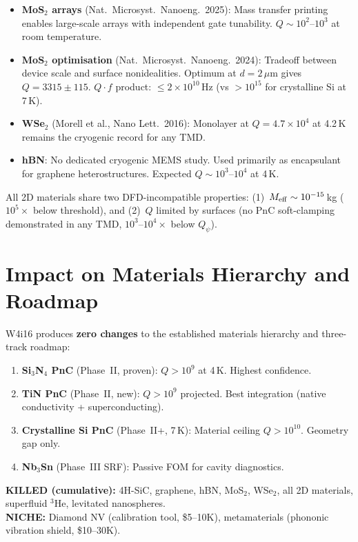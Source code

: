 \documentclass[11pt]{article}
\theoremstyle{definition}
\theoremstyle{remark}
\newcommand{\ee}[1]{\times 10^{#1}}
\newcommand{\Meff}{M_{\rm eff}}
\newcommand{\Qpsi}{Q_\psi}
\begin{document}
\begin{itemize}[nosep]
\item \textbf{MoS$_2$ arrays} (Nat.\ Microsyst.\ Nanoeng.\ 2025):
  Mass transfer printing enables large-scale arrays with independent
  gate tunability. $Q \sim 10^2$--$10^3$ at room temperature.
\item \textbf{MoS$_2$ optimisation} (Nat.\ Microsyst.\ Nanoeng.\ 2024):
  Tradeoff between device scale and surface nonidealities. Optimum at
  $d = 2$\,$\mu$m gives $Q = 3315 \pm 115$.
  $Q \cdot f$ product: $\leq 2\ee{10}$\,Hz (vs $> 10^{15}$ for
  crystalline Si at 7\,K).
\item \textbf{WSe$_2$} (Morell et al., Nano Lett.\ 2016): Monolayer
  at $Q = 4.7\ee{4}$ at 4.2\,K remains the cryogenic record for any
  TMD.
\item \textbf{hBN}: No dedicated cryogenic MEMS study. Used primarily
  as encapsulant for graphene heterostructures. Expected $Q \sim
  10^3$--$10^4$ at 4\,K.
\end{itemize}

All 2D materials share two DFD-incompatible properties:
(1)~$\Meff \sim 10^{-15}$\,kg ($10^{5}\times$ below threshold), and
(2)~$Q$ limited by surfaces (no PnC soft-clamping demonstrated in any
TMD, $10^3$--$10^4\times$ below $\Qpsi$).


\section{Impact on Materials Hierarchy and Roadmap}
\label{sec:impact}

W4i16 produces \textbf{zero changes} to the established materials
hierarchy and three-track roadmap:

\begin{tcolorbox}[colback=green!5!white, colframe=green!50!black,
  title=\textbf{Materials Hierarchy (UNCHANGED from W4i15)}]
\begin{enumerate}[nosep]
\item \textbf{Si$_3$N$_4$ PnC} (Phase~II, proven): $Q > 10^9$ at 4\,K.
  Highest confidence.
\item \textbf{TiN PnC} (Phase~II, new): $Q > 10^9$ projected. Best
  integration (native conductivity + superconducting).
\item \textbf{Crystalline Si PnC} (Phase~II+, 7\,K): Material ceiling
  $Q > 10^{10}$. Geometry gap only.
\item \textbf{Nb$_3$Sn} (Phase~III SRF): Passive FOM for cavity
  diagnostics.
\end{enumerate}
\textbf{KILLED (cumulative):} 4H-SiC, graphene, hBN, MoS$_2$, WSe$_2$,
all 2D materials, superfluid $^3$He, levitated nanospheres. \\
\textbf{NICHE:} Diamond NV (calibration tool, \$5--10K), metamaterials
(phononic vibration shield, \$10--30K).
\end{tcolorbox}
\end{document}
